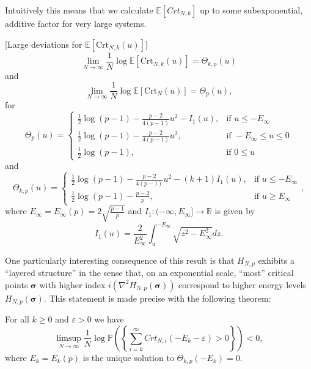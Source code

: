Intuitively this means that we calculate $\mathbb E[Crt_{N,k}]$ up to some subexponential, additive factor for very large systems.

\begin{theorem}\label{thm:1}[Large deviations for ${\mathbb E[\text{Crt}_{N,k}(u)]}$]
	\begin{equation}\label{thm:2.5}
		\lim_{N\rightarrow\infty}\frac{1}{N}\log\mathbb E[\text{Crt}_{N,k}(u)] = \Theta_{k,p}(u)
	\end{equation}
	and
	\begin{equation}\label{thm:2.8}
		\lim_{N\rightarrow\infty}\frac{1}{N}\log\mathbb E[\text{Crt}_N(u)] = \Theta_p(u),
	\end{equation}
	for $$\Theta_p(u)=\begin{cases}
						\frac{1}{2}\log(p-1)-\frac{p-2}{4(p-1)}u^2-I_1(u), &\mbox{if } u\leq-E_\infty \\
						\frac{1}{2}\log(p-1)-\frac{p-2}{4(p-1)}u^2, &\mbox{if } -E_\infty\leq u\leq 0\\ 
						\frac{1}{2}\log(p-1), &\mbox{if } 0\leq u
					  \end{cases}$$
	and
	$$\Theta_{k,p}(u)=\begin{cases}
						\frac{1}{2}\log(p-1)-\frac{p-2}{4(p-1)}u^2-(k+1)I_1(u), &\mbox{if } u\leq-E_\infty \\
						\frac{1}{2}\log(p-1)-\frac{p-2}{p}, &\mbox{if } u \geq E_\infty
					  \end{cases},$$
	where $E_\infty=E_\infty(p)=2\sqrt{\frac{p-1}{p}}$ and $I_1:(-\infty,E_\infty]\rightarrow\mathbb R$ is given by $$I_1(u)=\frac{2}{E_\infty^2}\int_u^{-E_\infty}\sqrt{z^2-E_\infty^2}dz.$$
\end{theorem}
One particularly interesting consequence of this result is that $H_{N,p}$ exhibits a ``layered structure'' in the sense that, on an exponential scale, ``most'' critical points $\bm\sigma$ with higher index $i(\nabla^2 H_{N,p}(\bm\sigma))$ correspond to higher energy levels $H_{N,p}(\bm\sigma)$. This statement is made precise with the following theorem:

\begin{theorem}\label{thm:layeredstruc}
	For all $k\geq 0$ and $\varepsilon>0$ we have
	\begin{equation}\label{thm:2.15}
		\limsup_{N\rightarrow\infty}\frac{1}{N}\log\mathbb P\left(\left\{\sum_{i=k}^\infty Crt_{N,i}(-E_k-\varepsilon)>0\right\}\right)<0,
	\end{equation}
	where $E_k=E_k(p)$ is the unique solution to $\Theta_{k,p}(-E_k)=0$.
\end{theorem}

